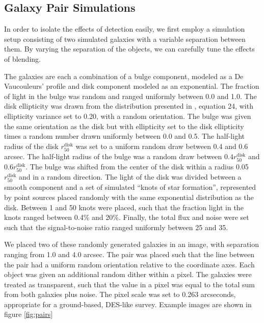 \documentclass[fleqn,useAMS,usenatbib]{mnras}
\begin{document}
\subsection{Galaxy Pair Simulations}
\label{sec:sims:pairs}

In order to isolate the effects of detection easily, we first employ a
simulation setup consisting of two simulated galaxies with a variable
separation between them. By varying the separation of the objects, we can
carefully tune the effects of blending.

The galaxies are each a combination of a bulge component, modeled as a De
Vaucouleurs' profile \citep{devauc1948} and disk component modeled as an
exponential. The fraction of light in the bulge was random and ranged uniformly
between 0.0 and 1.0. The disk ellipticity was drawn from the distribution
presented in \cite{ba14}, equation 24, with ellipticity variance set to 0.20,
with a random orientation. The bulge was given the same orientation as the disk
but with ellipticity set to the disk ellipticity times a random number drawn
uniformly between 0.0 and 0.5. The half-light radius of the disk
$r_{50}^{\mathrm{disk}}$ was set to a uniform random draw between 0.4 and 0.6
arcsec. The half-light radius of the bulge was a random draw between $0.4
r_{50}^{\mathrm{disk}}$ and $0.6 r_{50}^{\mathrm{disk}}$. The bulge was shifted
from the center of the disk within a radius 0.05$r_{50}^{\mathrm{disk}}$ and in
a random direction. The light of the disk was divided between a smooth component
and a set of simulated ``knots of star formation'', represented by point sources
placed randomly with the same exponential distribution as the disk.  Between 1
and 50 knots were placed, such that the fraction light in the knots ranged
between 0.4\% and 20\%. Finally, the total flux and noise were set such that the
signal-to-noise ratio ranged uniformly between 25 and 35.

We placed two of these randomly generated galaxies in an image, with separation
ranging from 1.0 and 4.0 arcsec. The pair was placed such that the line
between the pair had a uniform random orientation relative to the coordinate
axes. Each object was given an additional random dither within a pixel. The
galaxies were treated as transparent, such that the value in a pixel was equal
to the total sum from both galaxies plus noise. The pixel scale was set to 0.263
arcseconds, appropriate for a ground-based, DES-like survey. Example images are
shown in figure \ref{fig:pairs}
\end{document}
